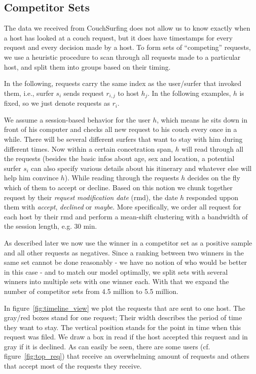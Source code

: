 \subsection{Competitor Sets} \label{subsec:competitor_sets}

The data we received from CouchSurfing does not allow us to know exactly when a host has looked at a couch request, but it does have timestamps for every request and every decision made by a host.
To form sets of ``competing'' requests, we use a heuristic procedure to scan through all requests made to a particular host, and split them into groups based on their timing.

In the following, requests carry the same index as the user/surfer that invoked them, i.e., surfer $s_i$ sends request $r_{i,j}$ to host $h_j$.
In the following examples, $h$ is fixed, so we just denote requests as $r_i$.

We assume a session-based behavior for the user $h$, which means he sits down in front of his computer and checks all new request to his couch every once in a while. There will be several different surfers that want to stay with him during different times. Now within a certain concetration span, $h$ will read through all the requests (besides the basic infos about age, sex and location, a potential surfer $s_i$ can also specify various details about his itinerary and whatever else will help him convince $h$). While reading through the requests $h$ decides on the fly which of them to accept or decline. Based on this notion we chunk together request by their \textit{request modification date} (rmd), the date $h$ responded uppon them with \textit{accept}, \textit{declined} or \textit{maybe}. More specifically, we order all request for each host by their rmd and perform a mean-shift clustering with a bandwidth of the session length, e.g. 30 min. 

As described later we now use the winner in a competitor set as a positive sample and all other requests as negatives. Since a ranking between two winners in the same set cannot be done reasonably - we have no notion of who would be better in this case - and to match our model optimally, we split sets with several winners into multiple sets with one winner each. With that we expand the number of competitor sets from 4.5 million to 5.5 million.

In figure~\ref{fig:timeline_view} we plot the requests that are sent to one host. The gray/red boxes stand for one request; Their width describes the period of time they want to stay. The vertical position stands for the point in time when this request was filed. We draw a box in read if the host accepted this request and in gray if it is declined. As can easily be seen, there are some users (cf. figure~\ref{fig:top_req}) that receive an overwhelming amount of requests and others that accept most of the requests they receive. 


